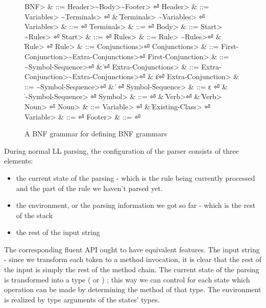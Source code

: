\begin{figure}[H]
  \begin{Grammar}
    \begin{aligned}
      \<BNF> & ::= \<Header>\~\<Body>\~\<Footer> \hfill⏎
      \<Header> & ::= \<Variables> \~\<Terminals> \hfill⏎
      {} & \| \<Terminals> \~\<Variables> \hfill⏎
      \<Variables> & ::= \hfill⏎
      \<Terminals> & ::= \hfill⏎
      \<Body> & ::= \<Start> \~\<Rules> \hfill⏎
      \<Start> & ::=  \hfill⏎
      \<Rules> & ::= \<Rule> \~\<Rules>\hfill⏎
      {} & \| \<Rule> \hfill⏎
      \<Rule> & ::=  \<Conjunctions>\hfill⏎
      \<Conjunctions> & ::= \<First-Conjunction>\~\<Extra-Conjunctions>\hfill⏎
      \<First-Conjunction> & ::= \~\<Symbol-Sequence>\hfill⏎
      {} & \| \hfill⏎
      \<Extra-Conjunctions> & ::= \<Extra-Conjunction>\~\<Extra-Conjunctions>\hfill⏎
      {} & \| ε\hfill⏎
      \<Extra-Conjunction> & ::= \~\<Symbol-Sequence>\hfill⏎
      {} & \|  \hfill⏎
      \<Symbol-Sequence> & ::= ε \hfill⏎
      {} & \| \~\<Symbol-Sequence> \hfill⏎
      \<Symbol> & ::=  \hfill⏎
      {} & \| \<Verb>\hfill⏎
      {} & \| \<Verb>~\cc{,} \<Noun> \hfill⏎
      \<Noun> & ::= \<Variable> \hfill⏎
      {} & \| \<Existing-Class> \hfill⏎
      \<Variable> & ::=  \hfill⏎
      \<Footer> & ::= \hfill⏎
    \end{aligned}
  \end{Grammar}
  \caption{A BNF grammar for defining BNF grammars}
  \label{Figure:BNF:BNF}
\end{figure}
During normal LL parsing, the configuration of the parser consists
  of three elements:
\begin{itemize}
  \item the current state of the parsing - which is the
    rule being currently processed and the part of the rule we
    haven't parsed yet.
  \item the environment, or the parsing information we got so far -
    which is the rest of the stack
  \item the rest of the input string
\end{itemize}

The corresponding \Java fluent API ought to have equivalent features.
The input string - since we transform each
  token to a method invocation, it is clear that the rest of the input is
  simply the rest of the method chain.
The current state of the parsing is transformed into a \Java type
  ( or ) ; this way we can control for each state
  which operation can be made by determining the method of that type.
The environment is realized by type arguments of the states' \Java types.

